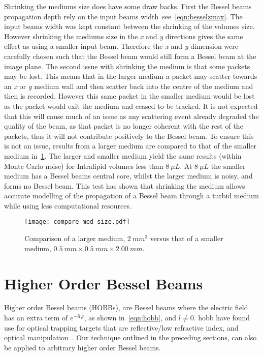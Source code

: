 Shrinking the mediums size does have some draw backs.
First the Bessel beams propagation depth rely on the input beams width\ see~\cref{eqn:besselzmax}.
The input beams width was kept constant between the shrinking of the volumes size.
However shrinking the mediums size in the \textit{x} and \textit{y} directions gives the same effect as using a smaller input beam.
Therefore the \textit{x} and \textit{y} dimension were carefully chosen such that the Bessel beam would still form a Bessel beam at the image plane.
The second issue with shrinking the medium is that some packets may be lost.
This means that in the larger medium a packet may scatter towards an \textit{x} or \textit{y} medium wall and then scatter back into the centre of the medium and then is recorded.
However this same packet in the smaller medium would be lost as the packet would exit the medium and ceased to be tracked.
It is not expected that this will cause much of an issue as any scattering event already degraded the quality of the beam, as that packet is no longer coherent with the rest of the packets, thus it will not contribute positively to the Bessel beam.
To ensure this is not an issue, results from a larger medium are compared to that of the smaller medium in~\cref{fig:compareBigSmall}.
The larger and smaller medium yield the same results (within Monte Carlo noise) for Intralipid volumes less than $8~\mu L$.
At $8~\mu L$ the smaller medium has a Bessel beams central core, whilst the larger medium is noisy, and forms no Bessel beam.
This test has shown that shrinking the medium allows accurate modelling of the propagation of a Bessel beam through a turbid medium while using less computational resources.

\begin{figure}[!ht]
    \centering
    \texttt{[image: compare-med-size.pdf]}
    \caption{Comparison of a larger medium, $2~mm^3$ versus that of a smaller medium, $0.5~mm \times 0.5~mm \times 2.00~mm$.}
    \label{fig:compareBigSmall}
\end{figure}

\FloatBarrier

\section{Higher Order Bessel Beams}

Higher order Bessel beams (HOBBs), are Bessel beams where the electric field has an extra term of $e^{-il\varphi}$, as shown in~\cref{eqn:hobb}, and $l \neq 0$.
\Gls*{hobb} have found use for optical trapping targets that are reflective/low refractive index, and optical manipulation~\cite{garces2002transfer,garces2003observation}.
Our technique outlined in the preceding sections, can also be applied to arbitrary higher order Bessel beams. 

